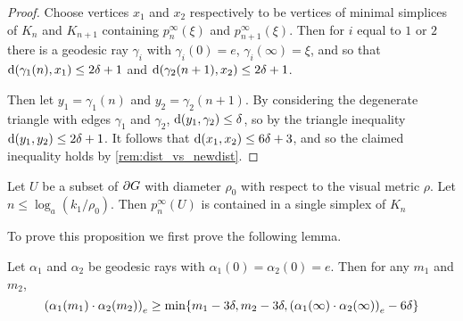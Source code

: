 \documentclass[a4paper]{article}
\begin{document}
\begin{proof}
  Choose vertices $x_1$ and $x_2$ respectively to be vertices of minimal
  simplices of $K_n$ and $K_{n+1}$ containing $p^\infty_n(\xi)$ and
  $p^\infty_{n+1}(\xi)$. Then for $i$ equal to $1$ or $2$ there is a geodesic
  ray $\gamma_i$ with $\gamma_i(0) = e$, $\gamma_i(\infty) = \xi$, and so that
  $\dist(\gamma_1(n), x_1) \leq 2\delta+1$ and $\dist(\gamma_2(n+1),
  x_2) \leq 2\delta+1$.

  Then let $y_1 = \gamma_1(n)$ and $y_2 = \gamma_2(n+1)$. By considering the
  degenerate triangle with edges $\gamma_1$ and $\gamma_2$,
  $\dist(y_1, \gamma_2) \leq \delta$, so by the triangle inequality
  $\dist(y_1, y_2) \leq 2\delta +1$. It follows that $\dist(x_1, x_2)
  \leq 6\delta+3$, and so the claimed inequality holds by
  \cref{rem:dist_vs_newdist}.
\end{proof}

\begin{proposition}\label{prop:projectstoasimplex}
  Let $U$ be a subset of $\boundary G$ with diameter $\rho_0$ with respect to
  the visual metric $\rho$. Let $n \leq \log_a(k_1/\rho_0)$. Then
  $p^\infty_n(U)$ is contained in a single simplex of $K_n$
\end{proposition}

To prove this proposition we first prove the following lemma.

\begin{lemma}\label{lem:boundary_gromov_product}
  Let $\alpha_1$ and $\alpha_2$ be geodesic rays with $\alpha_1(0) =
  \alpha_2(0) = e$. Then for any $m_1$ and $m_2$,
  \begin{equation*}
    \gromov{e}{\alpha_1(m_1)}{\alpha_2(m_2)} \geq 
        \min\{m_1 - 3\delta, m_2 - 3\delta, \gromov{e}{\alpha_1(\infty)}{\alpha_2(\infty)} - 6\delta\}
  \end{equation*}
\end{lemma}
\end{document}
